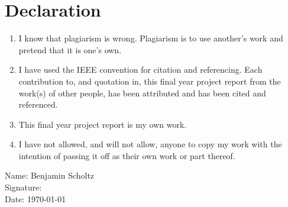 \chapter{Declaration}
\begin{enumerate}
\item I know that plagiarism is wrong. Plagiarism is to use another's work and pretend that it
is one's own.
\item I have used the IEEE convention for citation and referencing. Each contribution to, and
quotation in, this final year project report from the work(s) of other people, has been attributed and has been cited and referenced.
\item This final year project report is my own work.
\item I have not allowed, and will not allow, anyone to copy my work with the intention of passing it off as their own work or part thereof.
\end{enumerate}

\bigskip

\noindent
Name: Benjamin Scholtz \\
Signature: \underline{\hspace{3cm}} \\
Date: \today \\